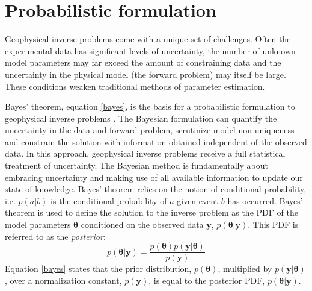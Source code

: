 
\section{Probabilistic formulation}

Geophysical inverse problems come with a unique set of challenges. Often the experimental data has significant levels of uncertainty, the number of unknown model parameters may far exceed the amount of constraining data and the uncertainty in the physical model (the forward problem) may itself be large. These conditions weaken  traditional methods of parameter estimation.\par

Bayes' theorem, equation \ref{bayes}, is the basis for a probabilistic formulation to geophysical inverse problems \citep{Tarantola1982a,Mosegaard1995,Sambridge2002,Mosegaard2002,Tarantola2005}. The Bayesian formulation can quantify the uncertainty in the data and forward problem, scrutinize model non-uniqueness and constrain the solution with information obtained independent of the observed data. In this approach, geophysical inverse problems receive a full statistical treatment of uncertainty. The Bayesian method is fundamentally about embracing uncertainty and making use of all available information to update our state of knowledge. Bayes' theorem relies on the notion of conditional probability, i.e. $p(a|b)$ is the conditional probability of $a$ given event $b$ has occurred. Bayes' theorem is used to define the solution to the inverse problem as the PDF of the model parameters $\bm{\theta}$ conditioned on the observed data $\bm{y}$, $p(\bm{\theta}|\bm{y})$. This PDF is referred to as the \textit{posterior}:
\begin{equation}
p(\bm{\theta}|\bm{y}) = \frac{p(\bm{\theta}) p(\bm{y}|\bm{\theta})}{p(\bm{y})}
\label{bayes}
\end{equation}
Equation \ref{bayes} states that the prior distribution, $p(\bm{\theta})$, multiplied by $p(\bm{y}|\bm{\theta})$, over a normalization constant, $p(\bm{y})$, is equal to the posterior PDF, $p(\bm{\theta}|\bm{y})$.\par

